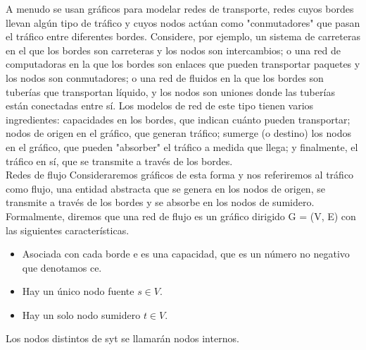 \documentclass[a4paper]{article}
\begin{document}
A menudo se usan gráficos para modelar redes de transporte, redes cuyos bordes llevan algún tipo de tráfico y cuyos nodos actúan como "conmutadores" que pasan el tráfico entre diferentes bordes. Considere, por ejemplo, un sistema de carreteras en el que los bordes son carreteras y los nodos son intercambios; o una red de computadoras en la que los bordes son enlaces que pueden transportar paquetes y los nodos son conmutadores; o una red de fluidos en la que los bordes son tuberías que transportan líquido, y los nodos son uniones donde las tuberías están conectadas entre sí. Los modelos de red de este tipo tienen varios ingredientes: capacidades en los bordes, que indican cuánto pueden transportar; nodos de origen en el gráfico, que generan tráfico; sumerge (o destino) los nodos en el gráfico, que pueden "absorber" el tráfico a medida que llega; y finalmente, el tráfico en sí, que se transmite a través de los bordes.\\

Redes de flujo Consideraremos gráficos de esta forma y nos referiremos al tráfico como flujo, una entidad abstracta que se genera en los nodos de origen, se transmite a través de los bordes y se absorbe en los nodos de sumidero. Formalmente, diremos que una red de flujo es un gráfico dirigido G = (V, E) con las siguientes características.\\

\begin{itemize}
    \item Asociada con cada borde e es una capacidad, que es un número no negativo que denotamos ce.
    \item Hay un único nodo fuente $s  \in  V$.
    \item Hay un solo nodo sumidero $t  \in  V$.
\end{itemize}

Los nodos distintos de syt se llamarán nodos internos.
\end{document}
